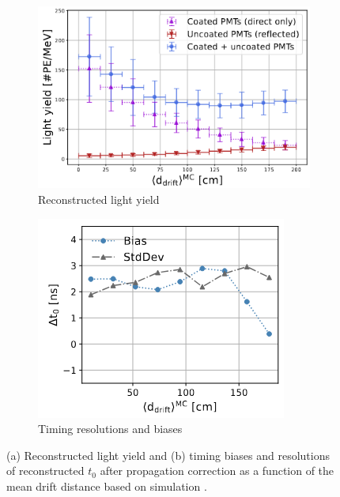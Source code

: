 \begin{figure}[ht!]
        \begin{subfigure}[b]{0.555\textwidth}  
            \centering 
            \includegraphics[width=\textwidth]{light_yield_sim}
            \caption{Reconstructed light yield}%
	    \label{fig:light_yield_Diego}
        \end{subfigure}
        \hfill
        \begin{subfigure}[b]{0.445\textwidth}  
            \centering 
            \includegraphics[width=\textwidth]{light_reco_err}
            \caption{Timing resolutions and biases}%
            \label{fig:light_reco_err}
        \end{subfigure}
	\caption[Reconstructed Light Yield and Reconstructed Timing Resolutions and Biases at SBND]{
		(a) Reconstructed light yield and (b) timing biases and resolutions of reconstructed $t_0$ after propagation correction as a function of the mean drift distance based on simulation \cite{sbnd_pds_paper}. 
	}
\end{figure}


